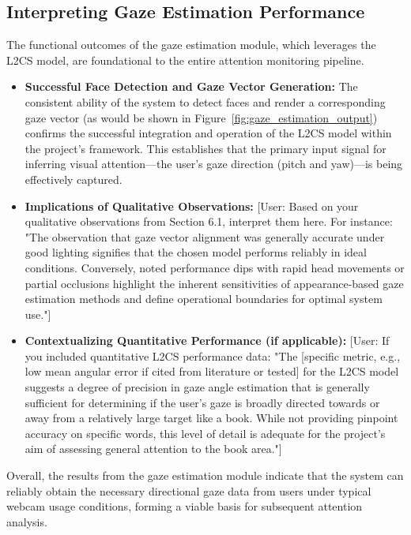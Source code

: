 \subsection{Interpreting Gaze Estimation Performance}
The functional outcomes of the gaze estimation module, which leverages the L2CS model, are foundational to the entire attention monitoring pipeline.
\begin{itemize}
    \item \textbf{Successful Face Detection and Gaze Vector Generation:} The consistent ability of the system to detect faces and render a corresponding gaze vector (as would be shown in Figure~\ref{fig:gaze_estimation_output}) confirms the successful integration and operation of the L2CS model within the project's framework. This establishes that the primary input signal for inferring visual attention—the user's gaze direction (pitch and yaw)—is being effectively captured.
    
    \item \textbf{Implications of Qualitative Observations:} [User: Based on your qualitative observations from Section 6.1, interpret them here. For instance: "The observation that gaze vector alignment was generally accurate under good lighting signifies that the chosen model performs reliably in ideal conditions. Conversely, noted performance dips with rapid head movements or partial occlusions highlight the inherent sensitivities of appearance-based gaze estimation methods and define operational boundaries for optimal system use."]
    
    \item \textbf{Contextualizing Quantitative Performance (if applicable):} [User: If you included quantitative L2CS performance data: "The [specific metric, e.g., low mean angular error if cited from literature or tested] for the L2CS model suggests a degree of precision in gaze angle estimation that is generally sufficient for determining if the user's gaze is broadly directed towards or away from a relatively large target like a book. While not providing pinpoint accuracy on specific words, this level of detail is adequate for the project's aim of assessing general attention to the book area."]
\end{itemize}
Overall, the results from the gaze estimation module indicate that the system can reliably obtain the necessary directional gaze data from users under typical webcam usage conditions, forming a viable basis for subsequent attention analysis.

